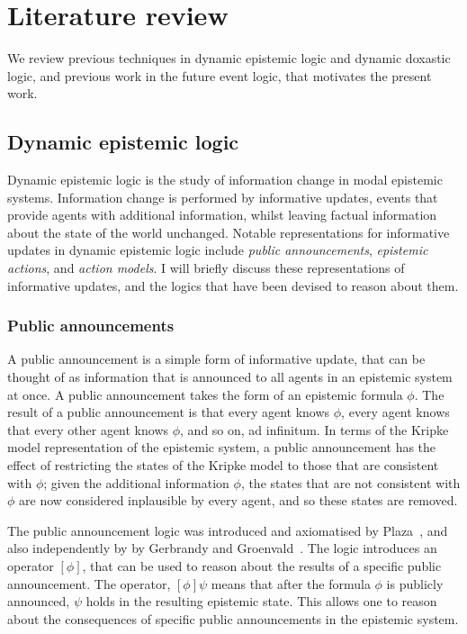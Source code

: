 \chapter{Literature review}

We review previous techniques in dynamic epistemic logic and dynamic doxastic
logic, and previous work in the future event logic, that motivates the present
work.

\section{Dynamic epistemic logic}

Dynamic epistemic logic is the study of information change in modal epistemic
systems. Information change is performed by informative updates, events that
provide agents with additional information, whilst leaving factual information
about the state of the world unchanged. Notable representations for informative
updates in dynamic epistemic logic include {\em public announcements}, {\em
epistemic actions}, and {\em action models}. I will briefly discuss these
representations of informative updates, and the logics that have been devised to
reason about them.

\subsection*{Public announcements}

A public announcement is a simple form of informative update, that can be
thought of as information that is announced to all agents in an epistemic system
at once. A public announcement takes the form of an epistemic formula $\phi$.
The result of a public announcement is that every agent knows $\phi$, every
agent knows that every other agent knows $\phi$, and so on, ad infinitum. In
terms of the Kripke model representation of the epistemic system, a public
announcement has the effect of restricting the states of the Kripke model to
those that are consistent with $\phi$; given the additional information $\phi$,
the states that are not consistent with $\phi$ are now considered inplausible by
every agent, and so these states are removed.

The public announcement logic was introduced and axiomatised by
Plaza~\cite{plaza2007logics}, and also independently by by Gerbrandy and
Groenvald~\cite{gerbrandy1997reasoning}.  The logic introduces an operator
$[\phi]$, that can be used to reason about the results of a specific public
announcement. The operator, $[\phi] \psi$ means that after the formula $\phi$ is
publicly announced, $\psi$ holds in the resulting epistemic state. This allows
one to reason about the consequences of specific public announcements in the
epistemic system.

